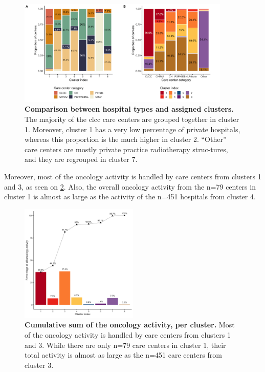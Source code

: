 \begin{figure}[H]
    \includegraphics[width=0.9\textwidth]{images/camion/supplemental/sup_fig2_categories_per_cluster.png}
    \centering
    \caption{
        \textbf{Comparison between hospital types and assigned clusters.} The majority of the \ac{clcc} care centers are grouped together in cluster 1. Moreover, cluster 1 has a very low percentage of private hospitals, whereas this proportion is the much higher in cluster 2. “Other” care centers are mostly private practice radiotherapy struc-tures, and they are regrouped in cluster 7.
    }
    \label{fig:clustering-categories}
\end{figure}

Moreover, most of the oncology activity is handled by care centers from clusters 1 and 3, as seen on \cref{fig:clustering-cumulative}. Also, the overall oncology activity from the n=79 centers in cluster 1 is almost as large as the activity of the n=451 hospitals from cluster 4.

\begin{figure}[H]
    \includegraphics[width=0.5\textwidth]{images/camion/supplemental/sup_fig3_nb_stays_per_cluster.png}
    \centering
    \caption{
        \textbf{Cumulative sum of the oncology activity, per cluster.} Most of the oncology activity is handled by care centers from clusters 1 and 3. While there are only n=79 care centers in cluster 1, their total activity is almost as large as the n=451 care centers from cluster 3.
    }
    \label{fig:clustering-cumulative}
\end{figure}

